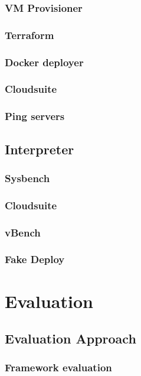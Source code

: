 \documentclass{report}
\begin{document}
\subsection{VM Provisioner}
\subsection{Terraform}
\subsection{Docker deployer}
\subsection{Cloudsuite}
\subsection{Ping servers}
\section{Interpreter}
\subsection{Sysbench}
\subsection{Cloudsuite}
\subsection{vBench}
\subsection{Fake Deploy}
\chapter{Evaluation}
\section{Evaluation Approach}
\subsection{Framework evaluation}
\end{document}
